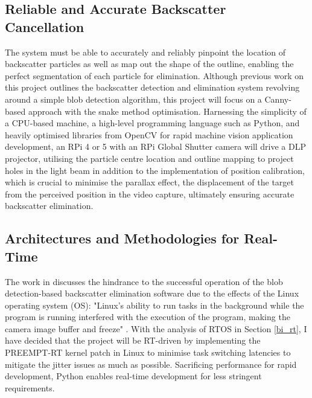 \subsection{Reliable and Accurate Backscatter Cancellation}
The system must be able to accurately and reliably pinpoint the location of backscatter particles as well as map out the shape of the outline, enabling the perfect segmentation of each particle for elimination. Although previous work on this project \cite{katieshepherdMachineVisionBased2023} outlines the backscatter detection and elimination system revolving around a simple blob detection algorithm, this project will focus on a Canny-based approach with the snake method optimisation. Harnessing the simplicity of a CPU-based machine, a high-level programming language such as Python, and heavily optimised libraries from OpenCV for rapid machine vision application development, an RPi 4 or 5 with an RPi Global Shutter camera will drive a DLP projector, utilising the particle centre location and outline mapping to project holes in the light beam in addition to the implementation of position calibration, which is crucial to minimise the parallax effect, the displacement of the target from the perceived position in the video capture, ultimately ensuring accurate backscatter elimination.

\subsection{Architectures and Methodologies for Real-Time}
The work in \cite{katieshepherdMachineVisionBased2023} discusses the hindrance to the successful operation of the blob detection-based backscatter elimination software due to the effects of the Linux operating system (OS): "Linux's ability to run tasks in the background while the program is running interfered with the execution of the program, making the camera image buffer and freeze" \cite{katieshepherdMachineVisionBased2023}. With the analysis of RTOS in Section \ref{bi_rt}, I have decided that the project will be RT-driven by implementing the PREEMPT-RT kernel patch in Linux to minimise task switching latencies to mitigate the jitter issues as much as possible. Sacrificing performance for rapid development, Python enables real-time development for less stringent requirements.

